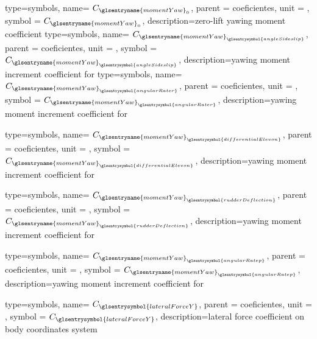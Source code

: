 {type=symbols,
    name= \ensuremath{C_{\glsentryname{momentYaw}_{0}}},
    parent = {coeficientes},
    unit = \unexpanded{},
    symbol = \ensuremath{C_{\glsentryname{momentYaw}_{0}}},
    description={zero-lift yawing moment coefficient}
}
{type=symbols,
    name= \ensuremath{C_{{\glsentryname{momentYaw}}_{\glsentrysymbol{angleSideslip}}}},
    parent = {coeficientes},
    unit = \unexpanded{},
    symbol = \ensuremath{C_{{\glsentryname{momentYaw}}_{\glsentrysymbol{angleSideslip}}}},
    description={yawing moment increment coefficient for }
}
{type=symbols,
    name= \ensuremath{C_{{\glsentryname{momentYaw}}_{\glsentrysymbol{angularRater}}}},
    parent = {coeficientes},
    unit = \unexpanded{},
    symbol = \ensuremath{C_{{\glsentryname{momentYaw}}_{\glsentrysymbol{angularRater}}}},
    description={yawing moment increment coefficient for }
}

{type=symbols,
    name= \ensuremath{C_{{\glsentryname{momentYaw}}_{\glsentrysymbol{differentialElevon}}}},
    parent = {coeficientes},
    unit = \unexpanded{},
    symbol = \ensuremath{C_{{\glsentryname{momentYaw}}_{\glsentrysymbol{differentialElevon}}}},
    description={yawing moment increment coefficient for }
}

{type=symbols,
    name= \ensuremath{C_{{\glsentryname{momentYaw}}_{\glsentrysymbol{rudderDeflection}}}},
    parent = {coeficientes},
    unit = \unexpanded{},
    symbol = \ensuremath{C_{{\glsentryname{momentYaw}}_{\glsentrysymbol{rudderDeflection}}}},
    description={yawing moment increment coefficient for }
}

{type=symbols,
    name= \ensuremath{C_{{\glsentryname{momentYaw}}_{\glsentrysymbol{angularRatep}}}},
    parent = {coeficientes},
    unit = \unexpanded{},
    symbol = \ensuremath{C_{{\glsentryname{momentYaw}}_{\glsentrysymbol{angularRatep}}}},
    description={yawing moment increment coefficient for }
}


{type=symbols,
    name= \ensuremath{C_{\glsentrysymbol{lateralForceY}}},
    parent = {coeficientes},
    unit = \unexpanded{},
    symbol = \ensuremath{C_{\glsentrysymbol{lateralForceY}}},
    description={lateral force coefficient on body coordinates system }
}


